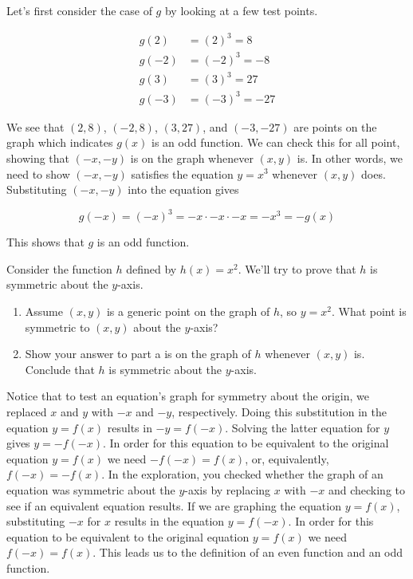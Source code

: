 \documentclass[nooutcomes]{ximera}
\begin{document}
Let's first consider the case of $g$ by looking at a few test points. 


\begin{align*}
g(2) & = (2)^3 = 8\\
g(-2) & = (-2)^3 = -8\\
g(3) & = (3)^3 = 27\\ 
g(-3) & = (-3)^3 = -27
\end{align*}

We see that $(2,8)$, $(-2,8)$, $(3,27)$, and $(-3,-27)$ are points on the graph which indicates $g(x)$ is an odd function. We can check this for all point, showing that $(-x,-y)$ is on the graph whenever $(x,y)$ is.  In other words, we need to show $(-x,-y)$ satisfies the equation $y = x^3$ whenever $(x,y)$ does.  Substituting $(-x, -y)$ into the equation gives


$$g(-x) = (-x)^3= -x\cdot -x \cdot -x = -x^3 = -g(x)$$

 This shows that $g$ is an odd function.



\begin{exploration}
Consider the function $h$ defined by $h(x) = x^2$. We'll try to prove that $h$ is symmetric about the $y$-axis. 
\begin{enumerate}[label=\alph*.]
\item Assume $(x, y)$ is a generic point on the graph of $h$, so $y = x^2$. What point is symmetric to $(x, y)$ about the $y$-axis?
\item Show your answer to part a is on the graph of $h$ whenever $(x, y)$ is. Conclude that $h$ is symmetric about the $y$-axis. 
\end{enumerate}
\end{exploration}

Notice that to test an equation's graph for symmetry about the origin, we replaced $x$ and $y$ with $-x$ and $-y$, respectively.  Doing this substitution in the equation $y = f(x)$ results in $-y = f(-x)$.  Solving the latter equation for $y$ gives $y = -f(-x)$.  In order for this equation to be equivalent to the original equation $y=f(x)$ we need $-f(-x) = f(x)$, or, equivalently, $f(-x) = -f(x)$. In the exploration, you checked whether the graph of an equation was symmetric about the $y$-axis by replacing $x$ with $-x$ and checking to see if an equivalent equation results.  If we are graphing the equation $y=f(x)$, substituting $-x$ for $x$ results in the equation $y=f(-x)$.  In order for this equation to be equivalent to the original equation $y=f(x)$ we need $f(-x) = f(x)$. This leads us to the definition of an even function and an odd function.
\end{document}
